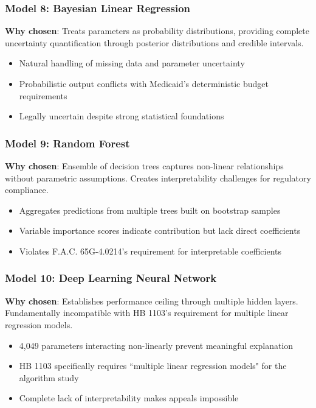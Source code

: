 \subsubsection{Model 8: Bayesian Linear Regression}
\textbf{Why chosen}: Treats parameters as probability distributions, providing complete uncertainty quantification through posterior distributions and credible intervals.
\begin{itemize}
    \item Natural handling of missing data and parameter uncertainty
    \item Probabilistic output conflicts with Medicaid's deterministic budget requirements
    \item Legally uncertain despite strong statistical foundations
\end{itemize}

\subsubsection{Model 9: Random Forest}
\textbf{Why chosen}: Ensemble of decision trees captures non-linear relationships without parametric assumptions. Creates interpretability challenges for regulatory compliance.
\begin{itemize}
    \item Aggregates predictions from multiple trees built on bootstrap samples
    \item Variable importance scores indicate contribution but lack direct coefficients
    \item Violates F.A.C. 65G-4.0214's requirement for interpretable coefficients
\end{itemize}

\subsubsection{Model 10: Deep Learning Neural Network}
\textbf{Why chosen}: Establishes performance ceiling through multiple hidden layers. Fundamentally incompatible with HB 1103's requirement for multiple linear regression models.
\begin{itemize}
    \item 4,049 parameters interacting non-linearly prevent meaningful explanation
    \item HB 1103 specifically requires ``multiple linear regression models" for the algorithm study
    \item Complete lack of interpretability makes appeals impossible
\end{itemize}


